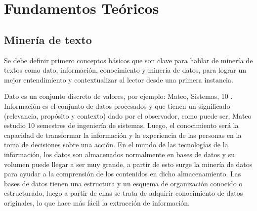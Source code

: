 \chapter{Fundamentos Teóricos}




\section{Minería de texto}

Se debe definir primero conceptos básicos que son clave para hablar de minería de textos 
como dato, información, conocimiento y minería de datos, para lograr un mejor entendimiento y
contextualizar al lector desde una primera instancia.

Dato es un conjunto discreto de valores, por ejemplo:  Mateo, Sistemas, 10 . Información es el conjunto de
datos procesados y que tienen un significado (relevancia, propósito y contexto) dado por el observador,
como puede ser, Mateo estudio 10 semestres   de ingeniería de sistemas. Luego, el conocimiento será la capacidad de
transformar la información y la experiencia de las personas en la toma de decisiones sobre una acción.
En el mundo de las tecnologías de la información, los datos son almacenados normalmente en bases de
datos y su volumen puede llegar a ser muy grande, a partir de esto surge la minería de datos para ayudar
a la comprensión de los contenidos en dicho almacenamiento. Las bases de datos tienen una estructura
y un esquema de organización conocido o estructurado, luego a partir de ellas se trata de adquirir conocimiento de datos
originales, lo que hace más fácil la extracción de información.

